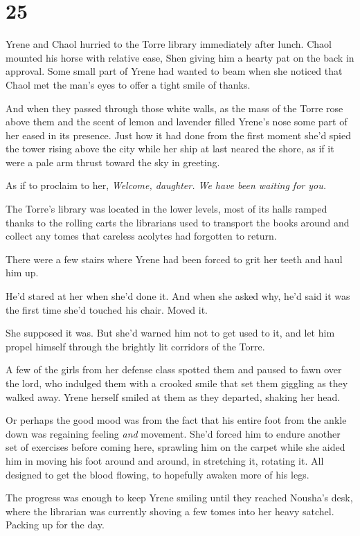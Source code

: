 
\chapter{25}

Yrene and Chaol hurried to the Torre library immediately after lunch. Chaol mounted his horse with relative ease, Shen giving him a hearty pat on the back in approval. Some small part of Yrene had wanted to beam when she noticed that Chaol met the man's eyes to offer a tight smile of thanks.

And when they passed through those white walls, as the mass of the Torre rose above them and the scent of lemon and lavender filled Yrene's nose
 some part of her eased in its presence. Just how it had done from the first moment she'd spied the tower rising above the city while her ship at last neared the shore, as if it were a pale arm thrust toward the sky in greeting.

As if to proclaim to her, \emph{Welcome, daughter. We have been waiting for you.}

The Torre's library was located in the lower levels, most of its halls ramped thanks to the rolling carts the librarians used to transport the books around and collect any tomes that careless acolytes had forgotten to return.

There were a few stairs where Yrene had been forced to grit her teeth and haul him up.

He'd stared at her when she'd done it. And when she asked why, he'd said it was the first time she'd touched his chair. Moved it.

She supposed it was. But she'd warned him not to get used to it, and let him propel himself through the brightly lit corridors of the Torre.

A few of the girls from her defense class spotted them and paused to fawn over the lord, who indulged them with a crooked smile that set them giggling as they walked away. Yrene herself smiled at them as they departed, shaking her head.

Or perhaps the good mood was from the fact that his entire foot from the ankle down was regaining feeling \emph{and} movement. She'd forced him to endure another set of exercises before coming here, sprawling him on the carpet while she aided him in moving his foot around and around, in stretching it, rotating it. All designed to get the blood flowing, to hopefully awaken more of his legs.

The progress was enough to keep Yrene smiling until they reached Nousha's desk, where the librarian was currently shoving a few tomes into her heavy satchel. Packing up for the day.

